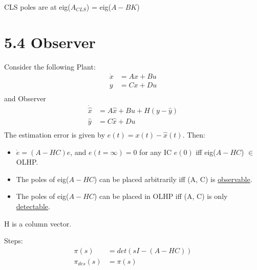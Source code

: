 CLS poles are at eig(\( A_{CLS} \)) = eig(\( A - BK \))

\section*{5.4 Observer}
Consider the following Plant:
\begin{equation*}
    \begin{aligned}
        \dot{x} & = Ax + Bu \\
        y       & = Cx + Du \\
    \end{aligned}
\end{equation*}
and Observer
\begin{equation*}
    \begin{aligned}
        \dot{\hat{x}} & = A\hat{x} + Bu + H(y - \hat{y}) \\
        \hat{y}       & = C\hat{x} + Du                  \\
    \end{aligned}
\end{equation*}
The estimation error is given by \( e(t) = x(t) - \hat{x}(t) \). Then:
\begin{itemize}
    \item \( \dot{e} = (A - HC)e \), and \( e(t = \infty) = 0 \) for any IC \( e(0) \) iff eig(\( A - HC \)) \( \in \) OLHP.
    \item The poles of eig(\( A - HC \)) can be placed arbitrarily iff (A, C) is \underline{observable}.
    \item The poles of eig(\( A - HC \)) can be placed in OLHP iff (A, C) is only \underline{detectable}.
\end{itemize}

H is a column vector.

Steps:
\begin{equation*}
    \begin{aligned}
        \pi(s)       & = det(sI - (A - HC)) \\
        \pi_{des}(s) & = \pi(s)             \\
    \end{aligned}
\end{equation*}


